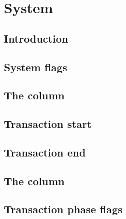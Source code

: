 
\section{System}
\subsection{Introduction}               \label{hub: system: intro}                     
\subsection{System flags}               \label{hub: system: system flags}              
\subsection{The \blockNumber{} column}  \label{hub: system: block number}              
\subsection{Transaction start}          \label{hub: system: transaction start}         
\subsection{Transaction end}            \label{hub: system: transaction end}           
\subsection{The \hubStamp{} column}     \label{hub: system: hub stamp}                 
\subsection{Transaction phase flags}    \label{hub: system: transaction phase flags}   
